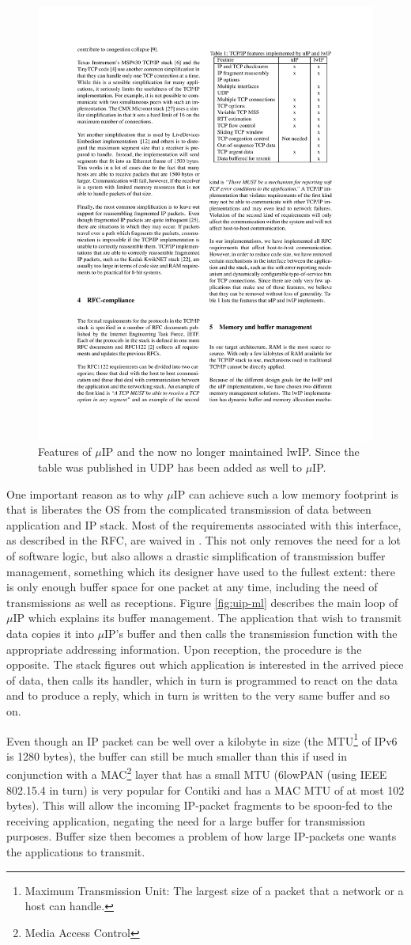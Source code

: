\documentclass[final,a4paper,twoside,11pt,onecolumn]{report}
\begin{document}
\begin{figure}
   \centering
   \includegraphics[width=.5\linewidth]{dunkels-uip-and-lwip}
   \caption{Features of $\mu$IP and the now no longer maintained lwIP. Since the table was published in \citep[p.4]{dunkels2003full} UDP has been added as well to $\mu$IP.}
   \label{fig:uip-features}
\end{figure}

One important reason as to why $\mu$IP can achieve such a low memory footprint is that is liberates the OS from the complicated transmission of data between application and IP stack. Most of the requirements associated with this interface, as described in the RFC, are waived in \citep[p.4]{dunkels2003full}. This not only removes the need for a lot of software logic, but also allows a drastic simplification of transmission buffer management, something which its designer have used to the fullest extent: there is only enough buffer space for one packet at any time, including the need of transmissions as well as receptions. Figure \ref{fig:uip-ml} describes the main loop of $\mu$IP which explains its buffer management. The application that wish to transmit data copies it into $\mu$IP's buffer and then calls the transmission function with the appropriate addressing information. Upon reception, the procedure is the opposite. The stack figures out which application is interested in the arrived piece of data, then calls its handler, which in turn is programmed to react on the data and to produce a reply, which in turn is written to the very same buffer and so on.

Even though an IP packet can be well over a kilobyte in size (the MTU\footnote{Maximum Transmission Unit: The largest size of a packet that a network or a host can handle.} of IPv6 is 1280 bytes), the buffer can still be much smaller than this if used in conjunction with a MAC\footnote{Media Access Control} layer that has a small MTU (6lowPAN (using IEEE 802.15.4 in turn) is very popular for Contiki and has a MAC MTU of at most 102 bytes\citep[section 4]{rfc4944}). This will allow the incoming IP-packet fragments to be spoon-fed to the receiving application, negating the need for a large buffer for transmission purposes. Buffer size then becomes a problem of how large IP-packets one wants the applications to transmit.
\end{document}
